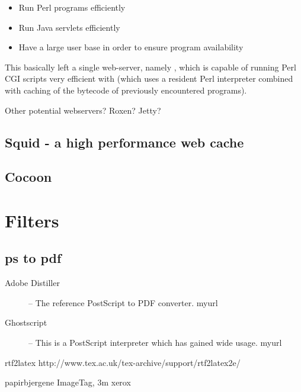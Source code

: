 \begin{itemize}
\item Run Perl programs efficiently
\item Run Java servlets efficiently
\item Have a large user base in order to ensure program availability
\end{itemize}

This basically left a single web-server, namely
, which is capable of running
Perl CGI scripts very efficient with
 (which
uses a resident Perl interpreter combined with caching of the bytecode
of previously encountered programs).

\textsf{Other potential webservers?  Roxen?  Jetty?}


\subsection{Squid - a high performance web cache}
\label{sec:squid}



\subsection{Cocoon}
\label{sec:cocoon}



\section{Filters}
\label{sec:cactus-filters}


\subsection{ps to pdf}
\label{sec:filter-ps-to-pdf}

\begin{description}
\item[Adobe Distiller] -- The reference PostScript to PDF converter.
  \textsf{myurl}
\item[Ghostscript] -- This is a PostScript interpreter which has gained
  wide usage.  \textsf{myurl}
\end{description}
rtf2latex http://www.tex.ac.uk/tex-archive/support/rtf2latex2e/


papirbjergene ImageTag, 3m xerox

